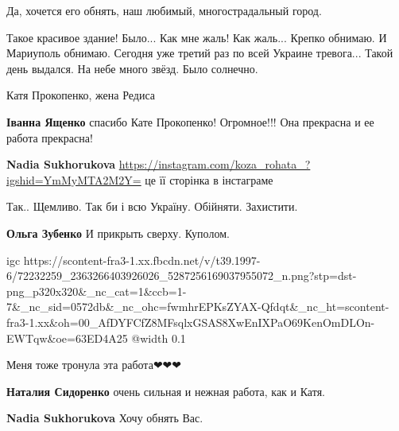  
 
 
 
 

\qqSecCmt


Да, хочется его обнять, наш любимый, многострадальный город.


\obeycr
Такое красивое здание!
Было...
Как мне жаль!
Как жаль...
Крепко обнимаю.
И Мариуполь обнимаю.
Сегодня уже третий раз по всей Украине тревога...
Такой день выдался.
На небе много звёзд.
Было солнечно.
\restorecr


Катя Прокопенко, жена Редиса

\begin{itemize} %
\textbf{Іванна Ященко} спасибо Кате Прокопенко! Огромное!!! Она прекрасна и ее работа прекрасна!

\textbf{Nadia Sukhorukova} \url{https://instagram.com/koza_rohata_?igshid=YmMyMTA2M2Y=} це її сторінка в інстаграме
\end{itemize} %


Так.. Щемливо. Так би і всю Україну. Обійняти. Захистити.

\textbf{Ольга Зубенко} И прикрыть сверху.
Куполом.


\ifcmt
  igc https://scontent-fra3-1.xx.fbcdn.net/v/t39.1997-6/72232259_2363266403926026_5287256169037955072_n.png?stp=dst-png_p320x320&_nc_cat=1&ccb=1-7&_nc_sid=0572db&_nc_ohc=fwmhrEPKsZYAX-Qfdqt&_nc_ht=scontent-fra3-1.xx&oh=00_AfDYFCfZ8MFsqlxGSAS8XwEnIXPaO69KenOmDLOn-EWTqw&oe=63ED4A25
	@width 0.1
\fi


Меня тоже тронула эта работа❤❤❤

\begin{itemize} %
\textbf{Наталия Сидоренко} очень сильная и нежная работа, как и Катя.

\textbf{Nadia Sukhorukova} Хочу обнять Вас.
\end{itemize} %


